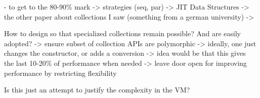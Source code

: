 \documentclass[sigconf, 10pt, review]{acmart}
\begin{document}
\begin{note}
 - to get to the 80-90\% mark
  -> strategies (seq, par)
  -> JIT Data Structures
     -> the other paper about collections I saw (something from a german university)
  ->

How to design so that specialized collections remain possible?
And are easily adopted?
 -> ensure subset of collection APIs are polymorphic
   -> ideally, one just changes the constructor, or adds a conversion
   -> idea would be that this gives the last 10-20\% of performance when needed
   -> leave door open for improving performance by restricting flexibility


Is this just an attempt to justify the complexity in the VM?

\end{note} 

% 



\end{document}
